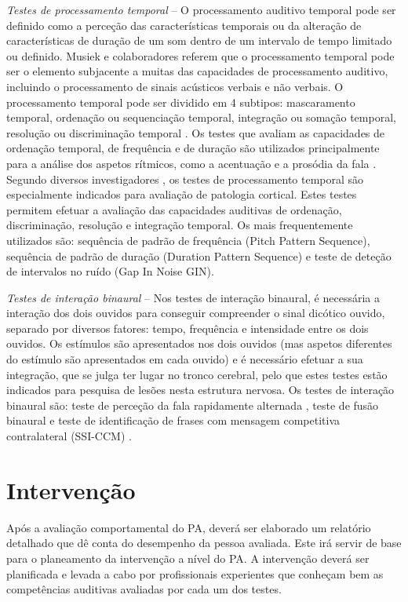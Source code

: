 \documentclass[output=paper,colorlinks,citecolor=brown,booklanguage=portuguese]{langscibook}
\begin{document}
\emph{Testes de processamento temporal} – O processamento auditivo temporal pode ser definido como a perceção das características temporais ou da alteração de características de duração de um som dentro de um intervalo de tempo limitado ou definido. Musiek e colaboradores referem que o processamento temporal pode ser o elemento subjacente a muitas das capacidades de processamento auditivo, incluindo o processamento de sinais acústicos verbais e não verbais. O processamento temporal pode ser dividido em 4 subtipos: mascaramento temporal, ordenação ou sequenciação temporal, integração ou somação temporal, resolução ou discriminação temporal \citep{Musiek2005}. Os testes que avaliam as capacidades de ordenação temporal, de frequência e de duração são utilizados principalmente para a análise dos aspetos rítmicos,  como a acentuação e a prosódia da fala \citep{Houston2002, Shinn2003}. Segundo diversos investigadores \citep{Pinheiro1985, Musiek1990, Olsen1991}, os testes de processamento temporal são especialmente indicados para avaliação de patologia cortical. Estes testes permitem efetuar a avaliação das capacidades auditivas de ordenação, discriminação, resolução e integração temporal. Os mais frequentemente utilizados são: sequência de padrão de frequência (Pitch Pattern Sequence), sequência de padrão de duração (Duration Pattern Sequence) e teste de deteção de intervalos no ruído (Gap In Noise GIN).

\emph{Testes de interação binaural} – Nos  testes de interação binaural, é necessária a interação dos dois ouvidos para conseguir compreender o sinal dicótico ouvido, separado por diversos fatores: tempo, frequência e intensidade entre os dois ouvidos. Os estímulos são apresentados nos dois ouvidos (mas aspetos diferentes do estímulo são apresentados em cada ouvido) e é necessário efetuar a sua integração, que se julga ter lugar no tronco cerebral, pelo que estes testes estão indicados para pesquisa de lesões nesta estrutura nervosa. Os testes de interação binaural são: teste de perceção da fala rapidamente alternada \citep{Gelfand2001}, teste de fusão binaural \citep{Matzker1959, Stach2000, Gelfand2001} e teste de identificação de frases com mensagem competitiva contralateral (SSI-CCM) \citep{Willeford1999}.

\section{Intervenção}
Após a avaliação comportamental do PA, deverá ser elaborado um relatório detalhado que dê conta do desempenho da pessoa avaliada. Este irá servir de base para o planeamento da intervenção a nível do PA. A intervenção deverá ser planificada e levada a cabo por profissionais experientes que conheçam bem as competências auditivas avaliadas por cada um dos testes.
\end{document}
